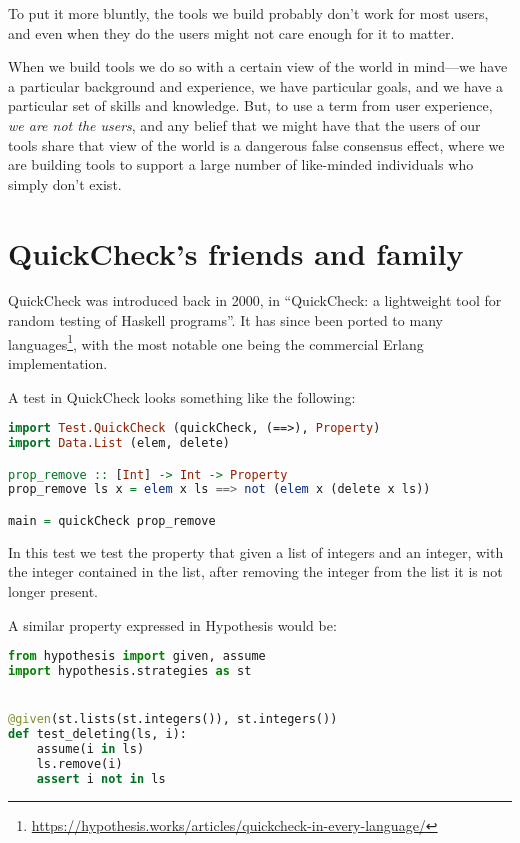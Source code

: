 To put it more bluntly,
the tools we build probably don't work for most users,
and even when they do the users might not care enough for it to matter.

When we build tools we do so with a certain view of the world in mind---we
have a particular background and experience,
we have particular goals,
and we have a particular set of skills and knowledge.
But,
to use a term from user experience,
\emph{we are not the users},
and any belief that we might have that the users of our tools share that view of the world is a dangerous false consensus effect\cite{ross1977false},
where we are building tools to support a large number of like-minded individuals who simply don't exist.

\chapter{QuickCheck's friends and family}\label{chap:quickcheck}

QuickCheck was introduced back in 2000,
in ``QuickCheck: a lightweight tool for random testing of Haskell programs''\cite{DBLP:conf/icfp/ClaessenH00}.
It has since been ported to many languages\footnote{\url{https://hypothesis.works/articles/quickcheck-in-every-language/}},
with the most notable one being the commercial Erlang implementation\cite{DBLP:conf/erlang/ArtsHJW06}.

A test in QuickCheck looks something like the following:

\begin{lstlisting}[language=Haskell]
import Test.QuickCheck (quickCheck, (==>), Property)
import Data.List (elem, delete)

prop_remove :: [Int] -> Int -> Property
prop_remove ls x = elem x ls ==> not (elem x (delete x ls))

main = quickCheck prop_remove
\end{lstlisting}

In this test we test the property that given a list of integers and an integer,
with the integer contained in the list,
after removing the integer from the list it is not longer present.

A similar property expressed in Hypothesis would be:

\begin{lstlisting}[language=Python]
from hypothesis import given, assume
import hypothesis.strategies as st


@given(st.lists(st.integers()), st.integers())
def test_deleting(ls, i):
    assume(i in ls)
    ls.remove(i)
    assert i not in ls
\end{lstlisting}

